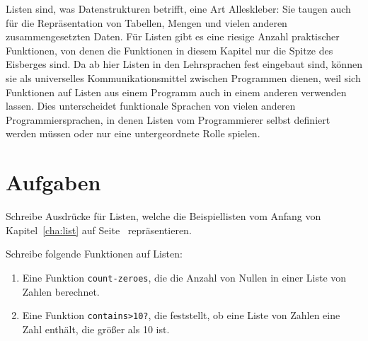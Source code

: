 Listen sind, was Datenstrukturen betrifft, eine Art Alleskleber:
Sie taugen auch für die Repräsentation von Tabellen,
Mengen und vielen anderen zusammengesetzten Daten.  Für Listen gibt es
eine riesige Anzahl praktischer Funktionen, von denen die Funktionen in
diesem Kapitel nur die Spitze des Eisberges sind.  Da 
ab hier Listen in den Lehrsprachen fest eingebaut sind, können sie als universelles
Kommunikationsmittel zwischen Programmen dienen, weil sich Funktionen
auf Listen aus einem Programm auch in einem anderen verwenden lassen.
Dies unterscheidet funktionale Sprachen von vielen anderen Programmiersprachen, in
denen Listen vom Programmierer selbst definiert werden müssen oder nur
eine untergeordnete Rolle spielen.

\section*{Aufgaben}

\begin{aufgabe}
  Schreibe Ausdrücke für Listen, welche die Beispiellisten vom
  Anfang von Kapitel~\ref{cha:list} auf Seite~\pageref{cha:list} repräsentieren.
\end{aufgabe}

\begin{aufgabe}
Schreibe folgende Funktionen auf Listen:
  
  \begin{enumerate} 
    
  \item Eine Funktion \lstinline{count-zeroes}, die die Anzahl von Nullen
    in einer Liste von Zahlen berechnet.
    
  \item Eine Funktion \lstinline{contains>10?}, die feststellt, ob eine
    Liste von Zahlen eine Zahl enthält, die größer als 10 ist.
  \end{enumerate}
  
\end{aufgabe}

